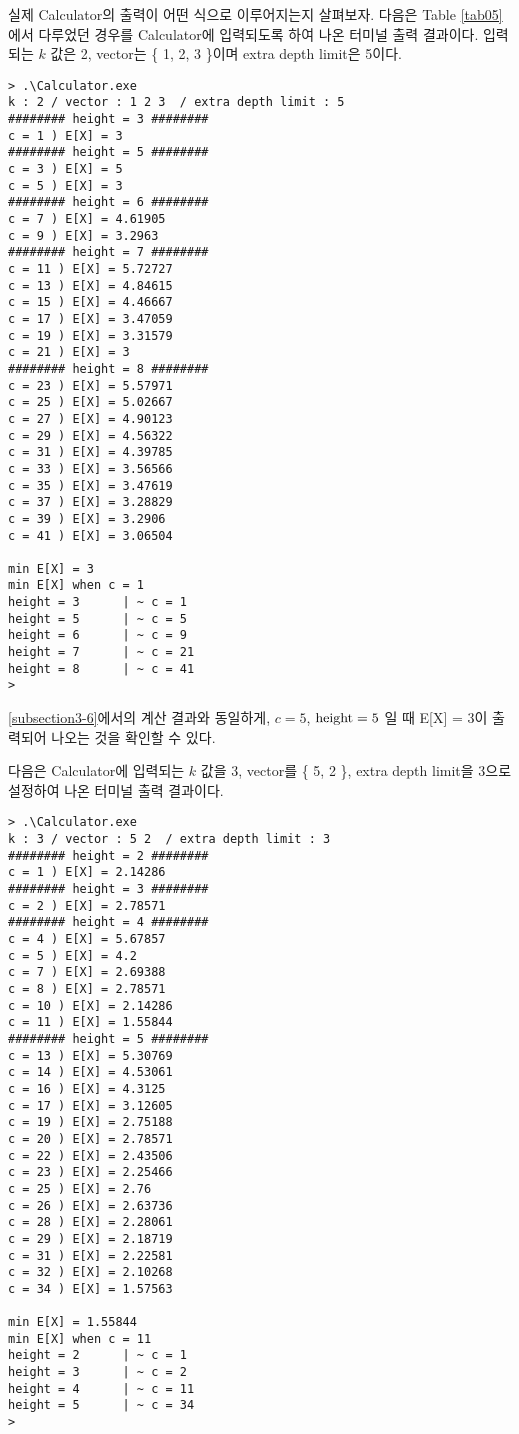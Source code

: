 \documentclass[11pt]{article}
\begin{document}
실제 Calculator의 출력이 어떤 식으로 이루어지는지 살펴보자. 다음은 Table \ref{tab05}에서 다루었던 경우를 Calculator에 입력되도록 하여 나온 터미널 출력 결과이다. 입력되는 $k$ 값은 2, vector는 \{ 1, 2, 3 \}이며 extra depth limit은 5이다.

\singlespacing
\begin{verbatim}
> .\Calculator.exe
k : 2 / vector : 1 2 3  / extra depth limit : 5
######## height = 3 ########
c = 1 ) E[X] = 3
######## height = 5 ########
c = 3 ) E[X] = 5
c = 5 ) E[X] = 3
######## height = 6 ########
c = 7 ) E[X] = 4.61905
c = 9 ) E[X] = 3.2963
######## height = 7 ########
c = 11 ) E[X] = 5.72727
c = 13 ) E[X] = 4.84615
c = 15 ) E[X] = 4.46667
c = 17 ) E[X] = 3.47059
c = 19 ) E[X] = 3.31579
c = 21 ) E[X] = 3
######## height = 8 ########
c = 23 ) E[X] = 5.57971
c = 25 ) E[X] = 5.02667
c = 27 ) E[X] = 4.90123
c = 29 ) E[X] = 4.56322
c = 31 ) E[X] = 4.39785
c = 33 ) E[X] = 3.56566
c = 35 ) E[X] = 3.47619
c = 37 ) E[X] = 3.28829
c = 39 ) E[X] = 3.2906
c = 41 ) E[X] = 3.06504

min E[X] = 3
min E[X] when c = 1
height = 3      | ~ c = 1
height = 5      | ~ c = 5
height = 6      | ~ c = 9
height = 7      | ~ c = 21
height = 8      | ~ c = 41
>
\end{verbatim}
\doublespacing

\noindent \ref{subsection3-6}에서의 계산 결과와 동일하게, $c = 5$, $\textnormal{height} = 5$ 일 때 E[X] = 3이 출력되어 나오는 것을 확인할 수 있다.
\newpage

다음은 Calculator에 입력되는 $k$ 값을 3, vector를 \{ 5, 2 \}, extra depth limit을 3으로 설정하여 나온 터미널 출력 결과이다.

\singlespacing
\begin{verbatim}
> .\Calculator.exe
k : 3 / vector : 5 2  / extra depth limit : 3
######## height = 2 ########
c = 1 ) E[X] = 2.14286
######## height = 3 ########
c = 2 ) E[X] = 2.78571
######## height = 4 ########
c = 4 ) E[X] = 5.67857
c = 5 ) E[X] = 4.2
c = 7 ) E[X] = 2.69388
c = 8 ) E[X] = 2.78571
c = 10 ) E[X] = 2.14286
c = 11 ) E[X] = 1.55844
######## height = 5 ########
c = 13 ) E[X] = 5.30769
c = 14 ) E[X] = 4.53061
c = 16 ) E[X] = 4.3125
c = 17 ) E[X] = 3.12605
c = 19 ) E[X] = 2.75188
c = 20 ) E[X] = 2.78571
c = 22 ) E[X] = 2.43506
c = 23 ) E[X] = 2.25466
c = 25 ) E[X] = 2.76
c = 26 ) E[X] = 2.63736
c = 28 ) E[X] = 2.28061
c = 29 ) E[X] = 2.18719
c = 31 ) E[X] = 2.22581
c = 32 ) E[X] = 2.10268
c = 34 ) E[X] = 1.57563

min E[X] = 1.55844
min E[X] when c = 11
height = 2      | ~ c = 1
height = 3      | ~ c = 2
height = 4      | ~ c = 11
height = 5      | ~ c = 34
>
\end{verbatim}
\doublespacing
\end{document}
